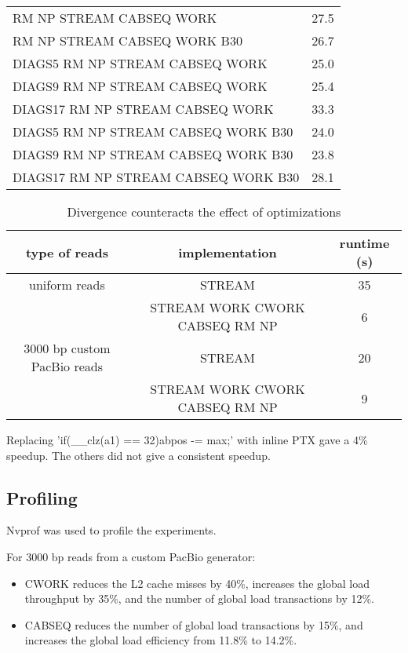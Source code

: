 \documentclass[../main/thesis.tex]{subfiles}
\begin{document}
\begin{table}
\begin{tabular}{l c}
RM NP STREAM CABSEQ WORK & 27.5 \\
RM NP STREAM CABSEQ WORK B30 & 26.7 \\
DIAGS5 RM NP STREAM CABSEQ WORK & 25.0 \\
DIAGS9 RM NP STREAM CABSEQ WORK & 25.4 \\
DIAGS17 RM NP STREAM CABSEQ WORK & 33.3 \\
DIAGS5 RM NP STREAM CABSEQ WORK B30 & 24.0 \\
DIAGS9 RM NP STREAM CABSEQ WORK B30 & 23.8 \\
DIAGS17 RM NP STREAM CABSEQ WORK B30 & 28.1 \\
\end{tabular}
\end{table}

\begin{table}
\centering
\caption{Divergence counteracts the effect of optimizations}
\label{tbl:daligner2}
\begin{tabular}{c|c|c}
type of reads & implementation & runtime (s) \\ \hline
uniform reads & STREAM & 35 \\
& STREAM WORK CWORK CABSEQ RM NP & 6 \\ \hline
3000 bp custom PacBio reads & STREAM & 20 \\
& STREAM WORK CWORK CABSEQ RM NP & 9 \\
\end{tabular}
\end{table}


Replacing 'if(\_\_clz(a1) == 32){abpos -= max;}' with inline PTX gave a 4\% speedup.
The others did not give a consistent speedup.



\subsection{Profiling}
Nvprof \cite{nvprof} was used to profile the experiments.

For 3000 bp reads from a custom PacBio generator:
\begin{itemize}
\item CWORK reduces the L2 cache misses by 40\%, increases the global load throughput by 35\%, and the number of global load transactions by 12\%. \vspace{-10pt}
\item CABSEQ reduces the number of global load transactions by 15\%, and increases the global load efficiency from 11.8\% to 14.2\%.
\end{itemize}
\end{document}
